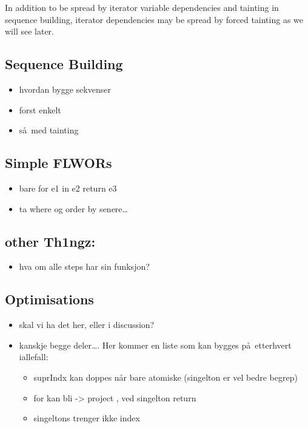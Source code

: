 In addition to be spread by iterator variable dependencies and tainting in sequence building, iterator dependencies
may be spread by forced tainting as we will see later. 

\subsection{Sequence Building}
\label{sect:trans:TD:seqBuild}
\begin{itemize}
  \item hvordan bygge sekvenser
  \item forst enkelt
  \item s\aa~med tainting
\end{itemize}

\subsection{Simple FLWORs}
\label{sect:trans:TD:simpleFLWOR}
\begin{itemize}
  \item bare for e1 in e2 return e3
  \item ta where og order by senere\ldots
\end{itemize}

\subsection{other Th1ngz:}
\begin{itemize}
  \item hva om alle steps har sin funksjon?
\end{itemize}


\subsection{Optimisations}
\label{sect:trans:optimisations}
\begin{itemize}
  \item skal vi ha det her, eller i discussion?
  \item kanskje begge deler\ldots. Her kommer en liste som kan bygges p\aa~etterhvert iallefall:
	  \begin{itemize}
	    \item suprIndx kan doppes n\aa r bare atomiske (singelton er vel bedre begrep)
	    \item for kan bli -> project , ved singelton return
	    \item singeltons trenger ikke index
	  \end{itemize} 
\end{itemize}